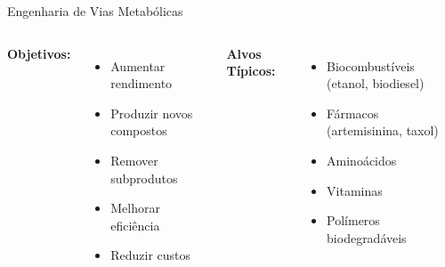 \begin{frame}{Engenharia de Vias Metabólicas}

\vspace{0.3cm}

\begin{columns}
\textbf{Objetivos:}
\begin{itemize}
    \item Aumentar rendimento
    \item Produzir novos compostos
    \item Remover subprodutos
    \item Melhorar eficiência
    \item Reduzir custos
\end{itemize}

\textbf{Alvos Típicos:}
\begin{itemize}
    \item Biocombustíveis (etanol, biodiesel)
    \item Fármacos (artemisinina, taxol)
    \item Aminoácidos
    \item Vitaminas
    \item Polímeros biodegradáveis
\end{itemize}
\end{columns}

\vspace{0.3cm}

\end{frame}

